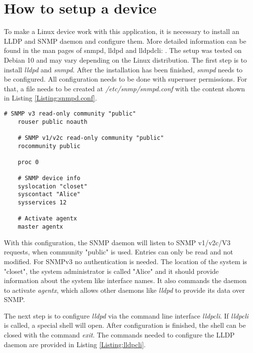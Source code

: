 \section{How to setup a device}
\label{Section:Evaluation-Setup}

To make a Linux device work with this application, it is necessary to install an LLDP and SNMP daemon and configure them. More detailed information can be found in the man pages of snmpd, lldpd and lldpdcli: \cite{MAN:SNMPD.CONF5:2021} \cite{MAN:LLDPD8:2021} \cite{MAN:LLDPCLI8:2021}. The setup was tested on Debian 10 and may vary depending on the Linux distribution. The first step is to install \textit{lldpd} and \textit{snmpd}. After the installation has been finished, \textit{snmpd} needs to be configured. All configuration needs to be done with superuser permissions. For that, a file needs to be created at \textit{/etc/snmp/snmpd.conf} with the content shown in Listing \ref{Listing:snmpd.conf}.

\begin{lstlisting}[label=Listing:snmpd.conf,captionpos=b,caption={snmpd.conf - Configuration file of the SNMP daemon}]
    # SNMP v3 read-only community "public"
    rouser public noauth
    
    # SNMP v1/v2c read-only community "public"
    rocommunity public
    
    proc 0
    
    # SNMP device info
    syslocation "closet"
    syscontact "Alice"
    sysservices 12
    
    # Activate agentx
    master agentx
\end{lstlisting}

With this configuration, the SNMP daemon will listen to SNMP v1/v2c/V3 requests, when community "public" is used. Entries can only be read and not modified. For SNMPv3 no authentication is needed. The location of the system is "closet", the system administrator is called "Alice" and it should provide information about the system like interface names. It also commands the daemon to activate \textit{agentx}, which allows other daemons like \textit{lldpd} to provide its data over SNMP.

The next step is to configure \textit{lldpd} via the command line interface \textit{lldpcli}. If \textit{lldpcli} is called, a special shell will open. After configuration is finished, the shell can be closed with the command \textit{exit}. The commands needed to configure the LLDP daemon are provided in Listing \ref{Listing:lldpcli}.

